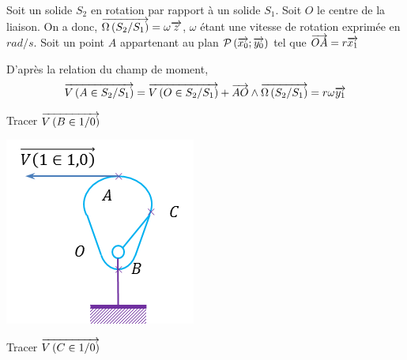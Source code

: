 \documentclass[10pt]{article}
\begin{document}
\begin{resultat}
Soit un solide $S_2$ en rotation par rapport à un solide $S_1$. Soit $O$ le centre de la liaison. On a donc, $\overrightarrow{\Omega\left( {S_2}/{S_1}\right)}=\omega\overrightarrow{z}$, $\omega$ étant une vitesse de rotation exprimée en $rad/s$. 
Soit un point $A$ appartenant au plan $\mathcal{P}\left(\overrightarrow{x_0};\overrightarrow{y_0}\right)$ tel que $\overrightarrow{OA} = r\overrightarrow{x_1}$

D'après la relation du champ de moment, 
$$
\overrightarrow{V\left( {A} \in {S_2}/{S_1}\right)}=\overrightarrow{V\left( {O} \in {S_2}/{S_1}\right)}+\overrightarrow{AO}\wedge\overrightarrow{\Omega\left( {S_2}/{S_1}\right)}=r\omega\overrightarrow{y_1}
$$
\end{resultat}
\begin{exemple}
\begin{minipage}[c]{.3\linewidth}
Tracer $\overrightarrow{V\left( {B} \in {1}/{0}\right)}$
\begin{center}
\includegraphics[width=\textwidth]{images/came}
\end{center}
\end{minipage}\hfill
\begin{minipage}[c]{.3\linewidth}
\begin{center}
Tracer $\overrightarrow{V\left( {C} \in {1}/{0}\right)}$

\end{center}
\end{minipage}
\end{exemple}
\end{document}
